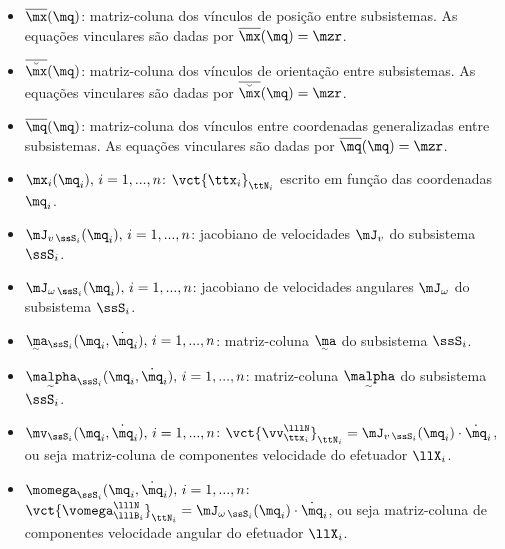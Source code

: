 \documentclass[]{politex}
\begin{document}
\begin{itemize}
\item $\overline{\mx}(\mq)$: matriz-coluna dos vínculos de posição entre subsistemas. As equações vinculares são dadas por $\overline{\mx}(\mq) = \mzr $.
\item $\overline{\breve{\mx}}(\mq)$: matriz-coluna dos vínculos de orientação entre subsistemas. As equações vinculares são dadas por $\overline{\breve{\mx}}(\mq) = \mzr $.
\item $\overline{\mq}(\mq)$: matriz-coluna dos vínculos entre coordenadas generalizadas entre subsistemas. As equações vinculares são dadas por $\overline{\mq}(\mq) = \mzr $.
\item $\mx_i(\mq_i), \,i=1, ..., n$: $\vct{\ttx_i}_{\ttN_i}$ escrito em função das coordenadas $\mq_i$.
\item $\mJ_{v\,\ssS_i}(\mq_i), \,i=1, ..., n$: jacobiano de velocidades $\mJ_v$ do subsistema $\ssS_i$.
\item $\mJ_{\omega\,\ssS_i}(\mq_i), \,i=1, ..., n$: jacobiano de velocidades angulares $\mJ_\omega$ do subsistema $\ssS_i$.
\item $\underaccent{\sim}{\ma}_{\ssS_i}(\mq_i, \dot{\mq}_i), \,i=1, ..., n$: matriz-coluna $\underaccent{\sim}{\ma}$ do subsistema $\ssS_i$.
\item $\underaccent{\sim}{\malpha}_{\ssS_i}(\mq_i, \dot{\mq}_i), \,i=1, ..., n$: matriz-coluna $\underaccent{\sim}{\malpha}$ do subsistema $\ssS_i$.
\item $\mv_{\ssS_i}(\mq_i, \dot{\mq}_i), \,i=1, ..., n$: $\vct{\vv_{\ttx_i}^{\lllN}}_{\ttN_i} = \mJ_{v\,\ssS_i}(\mq_i) \cdot \dot{\mq}_i$, ou seja matriz-coluna de componentes velocidade do efetuador $\llX_i$.
\item $\momega_{\ssS_i}(\mq_i, \dot{\mq}_i), \,i=1, ..., n$: $\vct{\vomega_{\lllB_i}^{\lllN}}_{\ttN_i} = \mJ_{\omega\,\ssS_i}(\mq_i) \cdot \dot{\mq}_i$, ou seja matriz-coluna de componentes velocidade angular do efetuador $\llX_i$.

\end{itemize}
\end{document}
